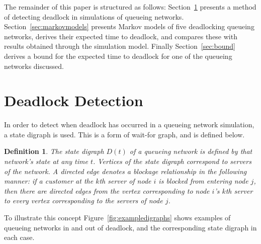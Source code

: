 \documentclass{article}
\newtheorem{definition}{Definition}
\numberwithin{equation}{section}
\begin{document}
The remainder of this paper is structured as follows: Section~\ref{sec:detectingdeadlock} presents a method of detecting deadlock in simulations of queueing networks. Section~\ref{sec:markovmodels} presents Markov models of five deadlocking queueing networks, derives their expected time to deadlock, and compares these with results obtained through the simulation model. Finally Section~\ref{sec:bound} derives a bound for the expected time to deadlock for one of the queueing networks discussed.


\section{Deadlock Detection}\label{sec:detectingdeadlock}

In order to detect when deadlock has occurred in a queueing network simulation, a state digraph is used.
This is a form of wait-for graph, and is defined below.


\begin{definition}
The state digraph $D(t)$ of a queueing network is defined by that network's state at any time $t$.
Vertices of the state digraph correspond to servers of the network.
A directed edge denotes a blockage relationship in the following manner: if a customer at the $k$th server of node $i$ is blocked from entering node $j$, then there are directed edges from the vertex corresponding to node $i$'s $k$th server to every vertex corresponding to the servers of node $j$.
\end{definition}

To illustrate this concept Figure~\ref{fig:exampledigraphs} shows examples of queueing networks in and out of deadlock, and the corresponding state digraph in each case.
\end{document}
